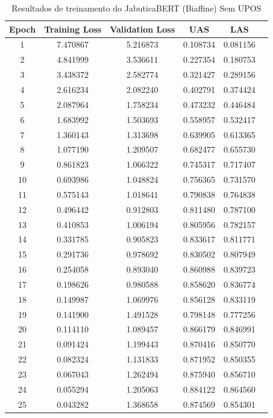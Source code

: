\begin{table}[ht]
\centering
\caption{Resultados de treinamento do JabuticaBERT (Biaffine) Sem UPOS}
\label{tab:bertimbau-large-biaffine_sem_upos}
\begin{tabular}{c c c c c c}
\hline
\textbf{Epoch} & \textbf{Training Loss} & \textbf{Validation Loss} & \textbf{UAS} & \textbf{LAS} \\
\hline
1 & 7.470867 & 5.216873 & 0.108734 & 0.081156 \\
2 & 4.841999 & 3.536611 & 0.227354 & 0.180753 \\
3 & 3.438372 & 2.582774 & 0.321427 & 0.289156 \\
4 & 2.616234 & 2.082240 & 0.402791 & 0.374424 \\
5 & 2.087964 & 1.758234 & 0.473232 & 0.446484 \\
6 & 1.683992 & 1.503693 & 0.558957 & 0.532417 \\
7 & 1.360143 & 1.313698 & 0.639905 & 0.613365 \\
8 & 1.077190 & 1.209507 & 0.682477 & 0.655730 \\
9 & 0.861823 & 1.066322 & 0.745317 & 0.717407 \\
10 & 0.693986 & 1.048824 & 0.756365 & 0.731570 \\
11 & 0.575143 & 1.018641 & 0.790838 & 0.764838 \\
12 & 0.496442 & 0.912803 & 0.811480 & 0.787100 \\
13 & 0.410853 & 1.006194 & 0.805956 & 0.782157 \\
14 & 0.331785 & 0.905823 & 0.833617 & 0.811771 \\
15 & 0.291736 & 0.978692 & 0.830502 & 0.807949 \\
16 & 0.254058 & 0.893040 & 0.860988 & 0.839723 \\
17 & 0.198626 & 0.980588 & 0.858620 & 0.836774 \\
18 & 0.149987 & 1.069976 & 0.856128 & 0.833119 \\
19 & 0.141900 & 1.491528 & 0.798148 & 0.777256 \\
20 & 0.114110 & 1.089457 & 0.866179 & 0.846991 \\
21 & 0.091424 & 1.199443 & 0.870416 & 0.850770 \\
22 & 0.082324 & 1.131833 & 0.871952 & 0.850355 \\
23 & 0.067043 & 1.262494 & 0.875940 & 0.856710 \\
24 & 0.055294 & 1.205063 & 0.884122 & 0.864560 \\
25 & 0.043282 & 1.368658 & 0.874569 & 0.854301 \\

\end{tabular}
\end{table}
